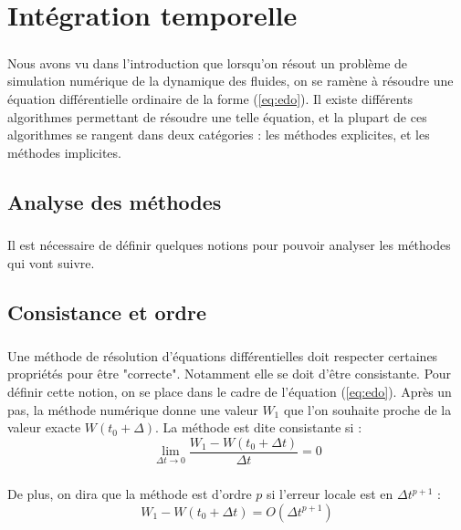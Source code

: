 \chapter{Intégration temporelle}

\paragraph{}
Nous avons vu dans l'introduction que lorsqu'on résout un problème de simulation numérique de la dynamique des fluides, on se ramène à résoudre une équation différentielle ordinaire de la forme (\ref{eq:edo}).
Il existe différents algorithmes permettant de résoudre une telle équation, et la plupart de ces algorithmes se rangent dans deux catégories : les méthodes explicites, et les méthodes implicites.

\section{Analyse des méthodes}

  \paragraph{}
  Il est nécessaire de définir quelques notions pour pouvoir analyser les méthodes qui vont suivre.

  \section{Consistance et ordre}

    \paragraph{}
    Une méthode de résolution d'équations différentielles doit respecter certaines propriétés pour être "correcte".
    Notamment elle se doit d'être consistante.
    Pour définir cette notion, on se place dans le cadre de l'équation (\ref{eq:edo}).
    Après un pas, la méthode numérique donne une valeur $W_1$ que l'on souhaite proche de la valeur exacte $W\left(t_0 + \Delta\right)$.
    La méthode est dite consistante si :
    $$\lim_{\Delta t \rightarrow 0} \frac{W_1 - W\left(t_0 + \Delta t\right)}{\Delta t} = 0$$

    \paragraph{}
    De plus, on dira que la méthode est d'ordre $p$ si l'erreur locale est en $\Delta t^{p+1}$ :
    $$W_1 - W\left(t_0 + \Delta t\right) = O\left(\Delta t^{p+1}\right)$$


